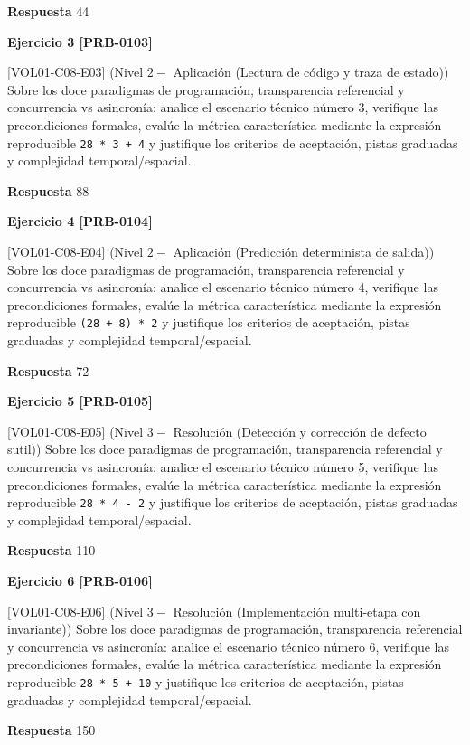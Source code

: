 \documentclass{book}
\begin{document}
\noindent\textbf{Respuesta} 44

\noindent\textbf{Ejercicio 3 [PRB-0103]}

[VOL01-C08-E03] (Nivel \(2 -\) Aplicación (Lectura de código y traza de estado)) Sobre los doce paradigmas de programación, transparencia referencial y concurrencia vs asincronía: analice el escenario técnico número 3, verifique las precondiciones formales, evalúe la métrica característica mediante la expresión reproducible \texttt{28 * 3 + 4} y justifique los criterios de aceptación, pistas graduadas y complejidad temporal/espacial.

\noindent\textbf{Respuesta} 88

\noindent\textbf{Ejercicio 4 [PRB-0104]}

[VOL01-C08-E04] (Nivel \(2 -\) Aplicación (Predicción determinista de salida)) Sobre los doce paradigmas de programación, transparencia referencial y concurrencia vs asincronía: analice el escenario técnico número 4, verifique las precondiciones formales, evalúe la métrica característica mediante la expresión reproducible \texttt{(28 + 8) * 2} y justifique los criterios de aceptación, pistas graduadas y complejidad temporal/espacial.

\noindent\textbf{Respuesta} 72

\noindent\textbf{Ejercicio 5 [PRB-0105]}

[VOL01-C08-E05] (Nivel \(3 -\) Resolución (Detección y corrección de defecto sutil)) Sobre los doce paradigmas de programación, transparencia referencial y concurrencia vs asincronía: analice el escenario técnico número 5, verifique las precondiciones formales, evalúe la métrica característica mediante la expresión reproducible \texttt{28 * 4 - 2} y justifique los criterios de aceptación, pistas graduadas y complejidad temporal/espacial.

\noindent\textbf{Respuesta} 110

\noindent\textbf{Ejercicio 6 [PRB-0106]}

[VOL01-C08-E06] (Nivel \(3 -\) Resolución (Implementación multi-etapa con invariante)) Sobre los doce paradigmas de programación, transparencia referencial y concurrencia vs asincronía: analice el escenario técnico número 6, verifique las precondiciones formales, evalúe la métrica característica mediante la expresión reproducible \texttt{28 * 5 + 10} y justifique los criterios de aceptación, pistas graduadas y complejidad temporal/espacial.

\noindent\textbf{Respuesta} 150
\end{document}

